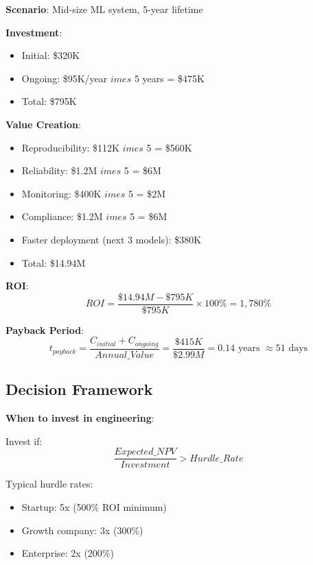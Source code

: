 \textbf{Scenario}: Mid-size ML system, 5-year lifetime

\textbf{Investment}:
\begin{itemize}
    \item Initial: \$320K
    \item Ongoing: \$95K/year $	imes$ 5 years = \$475K
    \item Total: \$795K
\end{itemize}

\textbf{Value Creation}:
\begin{itemize}
    \item Reproducibility: \$112K $	imes$ 5 = \$560K
    \item Reliability: \$1.2M $	imes$ 5 = \$6M
    \item Monitoring: \$400K $	imes$ 5 = \$2M
    \item Compliance: \$1.2M $	imes$ 5 = \$6M
    \item Faster deployment (next 3 models): \$380K
    \item Total: \$14.94M
\end{itemize}

\textbf{ROI}:
\begin{equation}
ROI = \frac{\$14.94M - \$795K}{\$795K} \times 100\% = 1,780\%
\end{equation}

\textbf{Payback Period}:
\begin{equation}
t_{payback} = \frac{C_{initial} + C_{ongoing}}{Annual\_Value} = \frac{\$415K}{\$2.99M} = 0.14 \text{ years } \approx 51 \text{ days}
\end{equation}

\subsection{Decision Framework}

\textbf{When to invest in engineering}:

Invest if:
\begin{equation}
\frac{Expected\_NPV}{Investment} > Hurdle\_Rate
\end{equation}

Typical hurdle rates:
\begin{itemize}
    \item Startup: 5x (500\% ROI minimum)
    \item Growth company: 3x (300\%)
    \item Enterprise: 2x (200\%)
\end{itemize}

